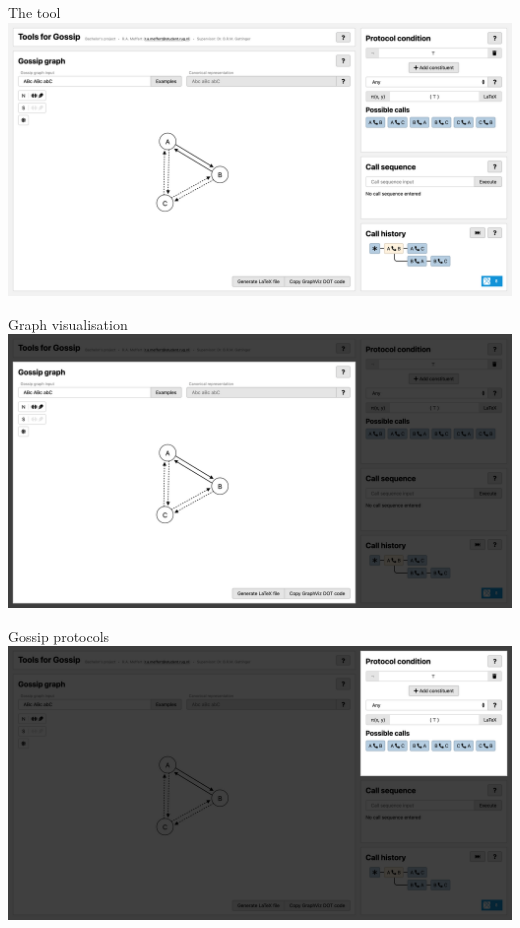\documentclass[aspectratio=169]{beamer}
\begin{document}
\begin{frame}[t]{The tool}
    \includegraphics[width=\linewidth]{images/tool.png}
\end{frame}
\begin{frame}[t]{Graph visualisation}
    \includegraphics[width=\linewidth]{images/tool-graph.png}
\end{frame}
\begin{frame}[t]{Gossip protocols}
    \includegraphics[width=\linewidth]{images/tool-protocol.png}
\end{frame}
\end{document}

